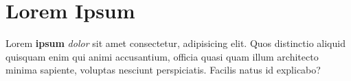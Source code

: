 \documentclass[12pt]{article}
\begin{document}
\section*{Lorem Ipsum}

Lorem \textbf{ipsum} \emph{dolor} sit amet consectetur, adipisicing elit. Quos distinctio aliquid quisquam enim qui animi accusantium, officia quasi quam illum architecto minima sapiente, voluptas nesciunt perspiciatis. Facilis natus id explicabo?
\end{document}
